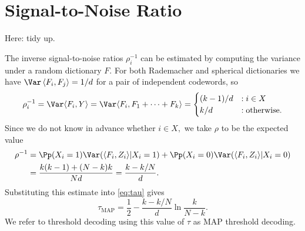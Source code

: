 \section{Signal-to-Noise Ratio \label{appendix:snr}}

\begin{tcolorbox}
Here: tidy up.
\end{tcolorbox}

The inverse signal-to-noise ratios $\rho_i^{-1}$ can be estimated by computing the variance under a random dictionary $F.$ For both Rademacher and spherical dictionaries we have $\Var\, \langle F_i, F_j \rangle = 1/d$ for a pair of independent codewords, so
$$
\rho_i^{-1} = \Var \langle F_i, Y \rangle = \Var \langle F_i, F_1 + \dots + F_k \rangle
= \begin{cases}
(k - 1)/d & : i \in X \\
k/d & : \text{otherwise}.
\end{cases}
$$
Since we do not know in advance whether $i \in X,$ we take $\rho$ to be the expected value
\begin{align*}
\rho^{-1} & = \Pp(X_i = 1) \Var(\langle F_i, Z_i \rangle | X_i = 1)  + \Pp(X_i = 0) \Var(\langle F_i, Z_i \rangle | X_i = 0)  \\
    & = \frac{k(k - 1) + (N - k)k}{Nd} = \frac{k - k/N} d.
\end{align*}
Substituting this estimate into \eqref{eq:tau} gives
$$
\tau_{\text{MAP}} = \frac 1 2 - \frac {k - k/N} d \ln \frac{k}{N - k}.
$$
We refer to threshold decoding using this value of $\tau$ as MAP threshold decoding.
